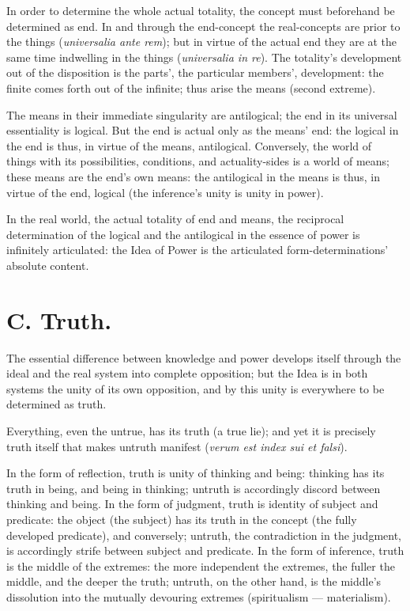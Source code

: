 \documentclass[12pt]{book}
\begin{document}
In order to determine the whole actual totality, the concept must
beforehand be determined as end. In and through the end-concept the
real-concepts are prior to the things (\textit{universalia ante
rem}); but in virtue of the actual end they are at the same time
indwelling in the things (\textit{universalia in re}). The
totality's development out of the disposition is the parts', the
particular members', development: the finite comes forth out of the
infinite; thus arise the means (second extreme).

The means in their immediate singularity are antilogical; the end in
its universal essentiality is logical. But the end is actual only as
the means' end: the logical in the end is thus, in virtue of the
means, antilogical. Conversely, the world of things with its
possibilities, conditions, and actuality-sides is a world of means;
these
means are the end's own means: the antilogical in the means is thus,
in virtue of the end, logical (the inference's unity is unity in
power).

In the real world, the actual totality of end and means, the
reciprocal determination of the logical and the antilogical in the
essence of power is infinitely articulated: the Idea of Power is the
articulated form-determinations' absolute content.


\chapter*{C. Truth.}
The essential difference between knowledge and power develops itself
through the ideal and the real system into complete opposition; but
the Idea is in both systems the unity of its own opposition, and by
this unity is everywhere to be determined as truth.

Everything, even the untrue, has its truth (a true lie); and yet it
is precisely truth itself that makes untruth manifest
(\textit{verum est index sui et falsi}).

In the form of reflection, truth is unity of thinking and being:
thinking has its truth in being, and being in thinking; untruth is
accordingly discord between thinking and being. In the form of
judgment, truth is identity of subject and predicate: the object
(the subject) has its truth in the concept (the fully developed
predicate), and conversely; untruth, the contradiction in the
judgment, is accordingly strife between subject and predicate. In
the form of inference, truth is the middle of the extremes: the more
independent the extremes, the fuller the middle, and the deeper the
truth; untruth, on the other hand, is the middle's dissolution into
the mutually devouring extremes (spiritualism --- materialism).
\end{document}
